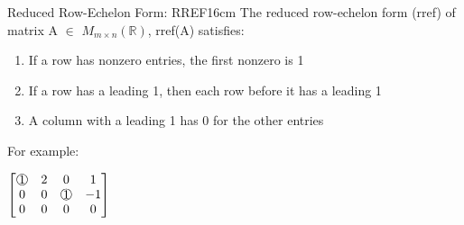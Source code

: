     \begin{definition}{Reduced Row-Echelon Form: RREF}{16cm}
        The {\color{lblue} reduced row-echelon form (rref)} of
        matrix A $\in$ $M_{m \times n}(\mathbb{R})$, rref(A) satisfies:

        \begin{enumerate}[label=(\alph*), leftmargin=1cm, itemsep=0.1cm]
            \item If a row has nonzero entries, the first nonzero is 1
    
            \item If a row has a leading 1, then each row before it has a leading 1
    
            \item A column with a leading 1 has 0 for the other entries
        \end{enumerate}

        For example:

        \hspace{0.5cm}
        $\begin{bmatrix}
            \circnum{1} & 2 & 0 & 1 \\
            0 & 0 & \circnum{1} & -1 \\
            0 & 0 & 0 & 0
        \end{bmatrix}$
    \end{definition}

    \vspace{0.5cm}



